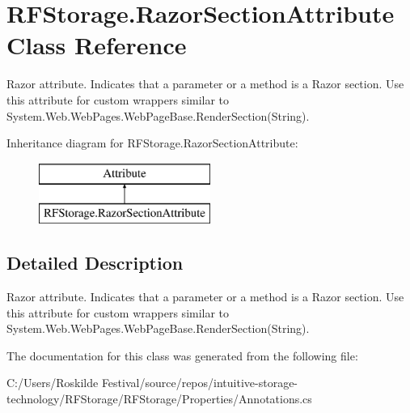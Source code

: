 \section{R\+F\+Storage.\+Razor\+Section\+Attribute Class Reference}
\label{class_r_f_storage_1_1_razor_section_attribute}


Razor attribute. Indicates that a parameter or a method is a Razor section. Use this attribute for custom wrappers similar to {\ttfamily System.\+Web.\+Web\+Pages.\+Web\+Page\+Base.\+Render\+Section(\+String)}.  


Inheritance diagram for R\+F\+Storage.\+Razor\+Section\+Attribute\+:\begin{figure}[H]
\begin{center}
\leavevmode
\includegraphics[height=2.000000cm]{class_r_f_storage_1_1_razor_section_attribute}
\end{center}
\end{figure}


\subsection{Detailed Description}
Razor attribute. Indicates that a parameter or a method is a Razor section. Use this attribute for custom wrappers similar to {\ttfamily System.\+Web.\+Web\+Pages.\+Web\+Page\+Base.\+Render\+Section(\+String)}. 



The documentation for this class was generated from the following file\+:\begin{DoxyCompactItemize}
\item 
C\+:/\+Users/\+Roskilde Festival/source/repos/intuitive-\/storage-\/technology/\+R\+F\+Storage/\+R\+F\+Storage/\+Properties/Annotations.\+cs\end{DoxyCompactItemize}
